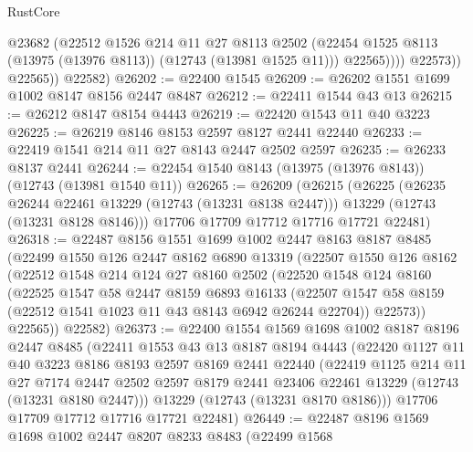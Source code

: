 \begin{lexlean}{RustCore}
\begin{coremodule}
                    @23682
                    (@22512
                      @1526
                      @214
                      @11
                      @27
                      @8113
                      @2502
                      (@22454 @1525 @8113 (@13975 (@13976 @8113)) (@12743 (@13981 @1525 @11)))
                      @22565))))
              @22573))
          @22565))
      @22582)
@26202 := @22400 @1545
@26209 := @26202 @1551 @1699 @1002 @8147 @8156 @2447 @8487
@26212 := @22411 @1544 @43 @13
@26215 := @26212 @8147 @8154 @4443
@26219 := @22420 @1543 @11 @40 @3223
@26225 := @26219 @8146 @8153 @2597 @8127 @2441 @22440
@26233 := @22419 @1541 @214 @11 @27 @8143 @2447 @2502 @2597
@26235 := @26233 @8137 @2441
@26244 := @22454 @1540 @8143 (@13975 (@13976 @8143)) (@12743 (@13981 @1540 @11))
@26265 := @26209
    (@26215
      (@26225
        (@26235 @26244 @22461 @13229 (@12743 (@13231 @8138 @2447)))
        @13229
        (@12743 (@13231 @8128 @8146)))
      @17706
      @17709
      @17712
      @17716
      @17721
      @22481)
@26318 := @22487
    @8156
    @1551
    @1699
    @1002
    @2447
    @8163
    @8187
    @8485
    (@22499
      @1550
      @126
      @2447
      @8162
      @6890
      @13319
      (@22507
        @1550
        @126
        @8162
        (@22512
          @1548
          @214
          @124
          @27
          @8160
          @2502
          (@22520
            @1548
            @124
            @8160
            (@22525
              @1547
              @58
              @2447
              @8159
              @6893
              @16133
              (@22507 @1547 @58 @8159 (@22512 @1541 @1023 @11 @43 @8143 @6942 @26244 @22704))
              @22573))
          @22565))
      @22582)
@26373 := @22400
    @1554
    @1569
    @1698
    @1002
    @8187
    @8196
    @2447
    @8485
    (@22411
      @1553
      @43
      @13
      @8187
      @8194
      @4443
      (@22420
        @1127
        @11
        @40
        @3223
        @8186
        @8193
        @2597
        @8169
        @2441
        @22440
        (@22419
          @1125
          @214
          @11
          @27
          @7174
          @2447
          @2502
          @2597
          @8179
          @2441
          @23406
          @22461
          @13229
          (@12743 (@13231 @8180 @2447)))
        @13229
        (@12743 (@13231 @8170 @8186)))
      @17706
      @17709
      @17712
      @17716
      @17721
      @22481)
@26449 := @22487
    @8196
    @1569
    @1698
    @1002
    @2447
    @8207
    @8233
    @8483
    (@22499
      @1568

\end{coremodule}
\end{lexlean}
